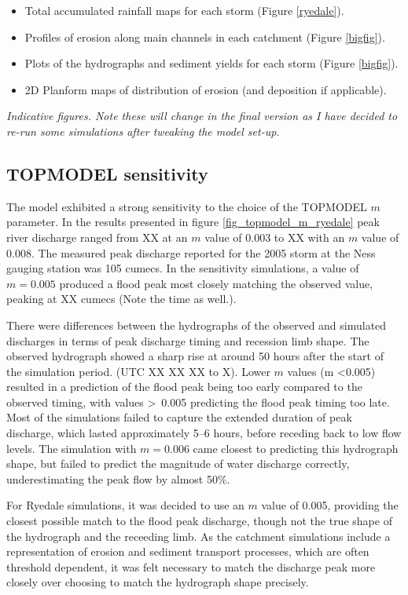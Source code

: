 \begin{itemize}
\item Total accumulated rainfall maps for each storm (Figure \ref{ryedale}). 
\item Profiles of erosion along main channels in each catchment (Figure \ref{bigfig}).
\item Plots of the hydrographs and sediment yields for each storm (Figure \ref{bigfig}).
\item 2D Planform maps of distribution of erosion (and deposition if applicable).
\end{itemize}

\textit{Indicative figures. Note these will change in the final version as I have decided to re-run some simulations after tweaking the model set-up.}

\subsection{TOPMODEL sensitivity}

The model exhibited a strong sensitivity to the choice of the TOPMODEL \( m\) parameter. In the results presented in figure \ref{fig_topmodel_m_ryedale} peak river discharge ranged from XX at an \(m\) value of 0.003 to XX with an \(m\) value of 0.008. The measured peak discharge reported for the 2005 storm at the Ness gauging station was 105 cumecs. In the sensitivity simulations, a value of \(m = 0.005\) produced a flood peak most closely matching the observed value, peaking at XX cumecs (Note the time as well.). 

There were differences between the hydrographs of the observed and simulated discharges in terms of peak discharge timing and recession limb shape. The observed hydrograph showed a sharp rise at around 50 hours after the start of the simulation period. (UTC XX XX XX to X). Lower \(m\) values (m \textless 0.005) resulted in a prediction of the flood peak being too early compared to the observed timing, with values \textgreater \ 0.005 predicting the flood peak timing too late. Most of the simulations failed to capture the extended duration of peak discharge, which lasted approximately 5--6 hours, before receding back to low flow levels. The simulation with \(m = 0.006\) came closest to predicting this hydrograph shape, but failed to predict the magnitude of water discharge correctly, underestimating the peak flow by almost 50\%. 

For Ryedale simulations, it was decided to use an \(m\) value of 0.005, providing the closest possible match to the flood peak discharge, though not the true shape of the hydrograph and the receeding limb. As the catchment simulations include a representation of erosion and sediment transport processes, which are often threshold dependent, it was felt necessary to match the discharge peak more closely over choosing to match the hydrograph shape precisely.


